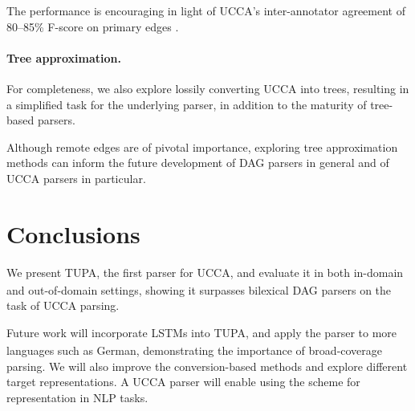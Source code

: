 \documentclass[a0,portrait]{a0poster}
\newcommand{\parser}[1]{TUPA\textsubscript{#1}}
\begin{document}
\begin{multicols}{2}
The performance is encouraging in light of
UCCA's inter-annotator agreement of 80--85\%
F-score on primary edges \cite{abend2013universal}.



\paragraph{Tree approximation.}

For completeness, we also explore lossily converting UCCA into trees,
resulting in a simplified task for the underlying parser,
in addition to the maturity of tree-based parsers.

Although remote edges are of pivotal importance, exploring tree approximation methods
can inform the future development of DAG parsers in general and of UCCA parsers in particular.


\section*{Conclusions}

We present \parser{}, the first parser for UCCA, and
evaluate it in both in-domain and out-of-domain settings,
showing it surpasses bilexical DAG parsers on the task of UCCA parsing.

Future work will incorporate LSTMs into \parser{},
and apply the parser to more languages such as German,
demonstrating the importance of broad-coverage parsing.
We will also improve the conversion-based methods and explore different target representations.
A UCCA parser will enable using the scheme for representation in NLP tasks.


\color{DarkSlateGray} %
\tiny


\end{multicols}
\end{document}
